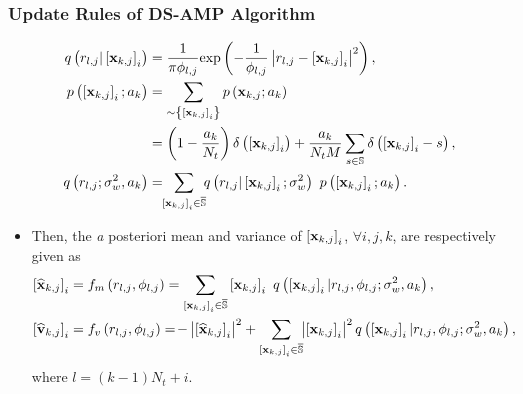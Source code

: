 \documentclass[9pt]{beamer}
\let \it = \textit
\begin{document}
\begin{frame}
\frametitle{Update Rules of DS-AMP Algorithm}
\begin{align}
\label{eq:LikelihoodAMP} q\left({r_{l,j}|\left[{{\bf x}_{k,j}}\right]_i}\right)&=\dfrac{1}{\pi\phi_{l,j}}{\rm exp}\left({-\dfrac{1}{\phi_{l,j}}\left|{r_{l,j}-\left[{{\bf x}_{k,j}}\right]_i}\right|^2}\right),\\
\label{eq:PriorMarginal} p\left({\left[{{\bf x}_{k,j}}\right]_i;a_k}\right)&=\sum\limits_{\sim\left\{{\left[{{\bf x}_{k,j}}\right]_i}\right\}} p\left({{\bf x}_{k,j};a_k}\right)\nonumber\\
&=\left({1-\dfrac{a_k}{N_t}}\right)\delta\left({\left[{{\bf x}_{k,j}}\right]_i}\right)+\dfrac{a_k}{N_tM}\sum\limits_{s\in\mathbb{S}}\delta\left({\left[{{\bf x}_{k,j}}\right]_i-s}\right),\\
\label{eq:NormulizeItem} q\left({r_{l,j};\sigma_w^2, a_k}\right)&=\!\!\sum\limits_{\left[{{\bf x}_{k,j}}\right]_i\in\mathbb{\overline S}}\!\!q\left({r_{l,j}|\left[{{\bf x}_{k,j}}\right]_i;\sigma_w^2}\right)~p\left({\left[{{\bf x}_{k,j}}\right]_i;a_k}\right).
\end{align}
\begin{itemize}
\item
Then, the {\it a posteriori} mean and variance of $\left[{{\bf x}_{k,j}}\right]_i$, $\forall i,j,k$, are respectively given as
\begin{align}
\label{eq:postmeanAMP} {\left[{\widehat{\bf x}_{k,j}}\right]_i}&=f_m\left({r_{l,j},\phi_{l,j}}\right)
=\sum\limits_{\left[{{\bf x}_{k,j}}\right]_i\in\mathbb{\overline S}}\left[{{\bf x}_{k,j}}\right]_i~q\left({\left[{{\bf x}_{k,j}}\right]_i|r_{l,j}, \phi_{l,j};\sigma_w^2, a_k}\right),\\
\label{eq:postvarAMP}{\left[{{\widehat{\bf v}}_{k,j}}\right]_i}&=f_v\left({r_{l,j},\phi_{l,j}}\right)
=\!-\left|{\left[{\widehat{{\bf x}}_{k,j}}\right]_i}\right|^2+\sum\limits_{\left[{{\bf x}_{k,j}}\right]_i\in\mathbb{\overline S}}\!\!\left|{\left[{{\bf x}_{k,j}}\right]_i}\right|^2q\left({\left[{{\bf x}_{k,j}}\right]_i|r_{l,j}, \phi_{l,j};\sigma_w^2, a_k}\right),
\end{align}
where $l=(k-1)N_t+i$.
\end{itemize}
\end{frame}
\end{document}
